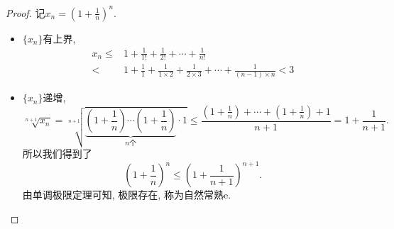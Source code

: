 \begin{proof}
    记$x_n = \left( 1+\frac{1}{n} \right) ^{n}$.
    \begin{itemize}
      \item $\{ x_n \}$有上界, 
      \begin{equation}
        \begin{aligned}
          x_n \le  & 1 + \frac{1}{1!} + \frac{1}{2!} + \cdots + \frac{1}{n!}
          \\
          < & 1 + \frac{1}{1} + \frac{1}{1\times 2} + \frac{1}{2\times 3} + \cdots + \frac{1}{\left( n-1 \right) \times n} <3
        \end{aligned}
      \end{equation}

      \item $\{ x_n \}$递增,
      \begin{equation}
        \sqrt[n+1]{x_n} = \sqrt[n+1]{\underbrace{\left( 1+\frac{1}{n} \right) \cdots \left( 1+\frac{1}{n} \right) }_{\text{$n$个}}\cdot 1} \le  \frac{\left( 1+\frac{1}{n} \right) + \cdots + \left( 1+\frac{1}{n} \right) +1}{n+1} = 1 + \frac{1}{n+1}.
      \end{equation}
      所以我们得到了
      \begin{equation}
        \left( 1+\frac{1}{n} \right) ^{n} \le \left( 1+\frac{1}{n+1} \right) ^{n+1}.
      \end{equation}
      由单调极限定理可知, 极限存在, 称为自然常熟$\mathrm{e}$.
    \end{itemize}
\end{proof}

